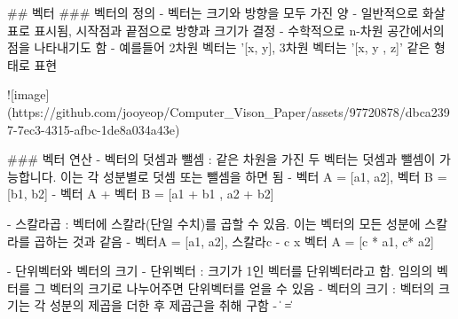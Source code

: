 ## 벡터
  ### 벡터의 정의
  - 벡터는 크기와 방향을 모두 가진 양
  - 일반적으로 화살표로 표시됨, 시작점과 끝점으로 방향과 크기가 결정
  - 수학적으로 n-차원 공간에서의 점을 나타내기도 함
  - 예를들어 2차원 벡터는 '[x, y], 3차원 벡터는 '[x, y , z]' 같은 형태로 표현

    ![image](https://github.com/jooyeop/Computer_Vison_Paper/assets/97720878/dbca2397-7ec3-4315-afbc-1de8a034a43e)

  ### 벡터 연산
  - 벡터의 덧셈과 뺄셈 : 같은 차원을 가진 두 벡터는 덧셈과 뺄셈이 가능합니다. 이는 각 성분별로 덧셈 또는 뺄셈을 하면 됨
    - 벡터 A = [a1, a2], 벡터 B = [b1, b2]
    - 벡터 A + 벡터 B = [a1 + b1 , a2 + b2]

  - 스칼라곱 : 벡터에 스칼라(단일 수치)를 곱할 수 있음. 이는 벡터의 모든 성분에 스칼라를 곱하는 것과 같음
    - 벡터A = [a1, a2], 스칼라c
    - c x 벡터 A = [c * a1, c* a2]
   
  - 단위벡터와 벡터의 크기
    - 단위벡터 : 크기가 1인 벡터를 단위벡터라고 함. 임의의 벡터를 그 벡터의 크기로 나누어주면 단위벡터를 얻을 수 있음
    - 벡터의 크기 : 벡터의 크기는 각 성분의 제곱을 더한 후 제곱근을 취해 구함
    - \|  \| = 
